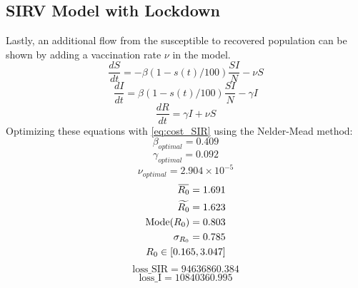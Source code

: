 \documentclass[tikz,fleqn,12pt]{wlscirep}
\newcommand{\overbar}[1]{\mkern 1.5mu\overline{\mkern-1.5mu#1\mkern-1.5mu}\mkern 1.5mu}
\begin{document}
\subsection{SIRV Model with Lockdown}
Lastly, an additional flow from the susceptible to recovered population can be shown by adding a vaccination rate $\nu$ in the model. 
\begin{equation}
  \frac{dS}{dt} = -\beta (1 - s(t)/100) \frac{S I}{N} - \nu S
  \label{eq:S_with_lockdown_and_nu}
\end{equation}
\begin{equation}
  \frac{dI}{dt} = \beta (1 - s(t)/100) \frac{S I}{N} - \gamma I
  \label{eq:I_with_lockdown_and_nu}
\end{equation}
\begin{equation}
  \frac{dR}{dt} = \gamma I + \nu S
  \label{eq:R_with_lockdown_and_nu}
\end{equation}
Optimizing these equations with \cref{eq:cost_SIR} using the Nelder-Mead method:
\begin{equation}
  \beta_{optimal} = 0.409
  \label{eq:beta_optimal_with_lockdown_and_nu}
\end{equation}
\begin{equation}
  \gamma_{optimal} = 0.092
  \label{eq:gamma_optimal_with_lockdown_and_nu}
\end{equation}
\begin{equation}
  \nu_{optimal} = 2.904 \times 10^{-5}
  \label{eq:nu_optimal_with_lockdown_and_nu}
\end{equation}
\begin{equation}
  \begin{split}
    \overbar{R_0} = 1.691 \\
    \widetilde{R_0} = 1.623 \\
    \text{Mode}(R_0) = 0.803 \\
    \sigma_{R_0} = 0.785 \\
    R_0 \in [0.165, 3.047]
  \end{split}
  \label{eq:r0_with_lockdown_and_nu}
\end{equation}
\begin{equation}
  \textrm{loss\_SIR} = 94636860.384
  \label{eq:cost_SIR_with_lockdown_and_nu}
\end{equation}
\begin{equation}
  \textrm{loss\_I} = 10840360.995
  \label{eq:cost_I_with_lockdown_and_nu}
\end{equation}
\end{document}
